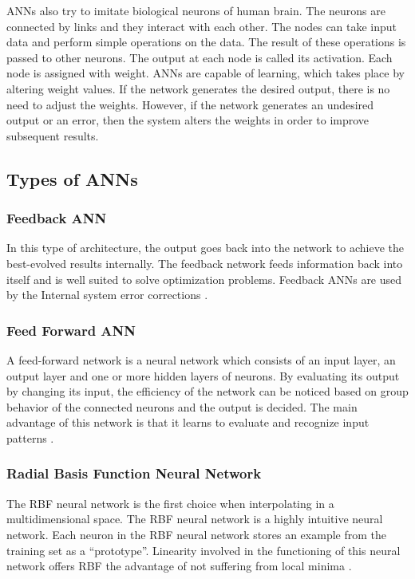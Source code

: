 ANNs also try to imitate biological neurons of human brain. The neurons are connected by links and they interact with each other. The nodes can take input data and perform simple operations on the data. The result of these operations is passed to other neurons. The output at each node is called its activation. Each node is assigned with weight. ANNs are capable of learning, which takes place by altering weight values. If the network generates the desired output, there is no need to adjust the weights. However, if the network generates an undesired output or an error, then the system alters the weights in order to improve subsequent results.

\subsection{Types of ANNs}

\subsubsection{Feedback ANN}

In this type of architecture, the output goes back into the network to achieve the best-evolved results internally. The feedback network feeds information back into itself and is well suited to solve optimization problems. Feedback ANNs are used by the Internal system error corrections \cite{Neuralnet}. 

\subsubsection{Feed Forward ANN}

A feed-forward network is a neural network which consists of an input layer, an output layer and one or more hidden layers of neurons. By evaluating its output by changing its input, the efficiency of the network can be noticed based on group behavior of the connected neurons and the output is decided. The main advantage of this network is that it learns to evaluate and recognize input patterns \cite{Neuralnet}.

\subsubsection{Radial Basis Function Neural Network}

The RBF neural network is the first choice when interpolating in a multidimensional space. The RBF neural network is a highly intuitive neural network. Each neuron in the RBF neural network stores an example from the training set as a ``prototype''. Linearity involved in the functioning of this neural network offers RBF the advantage of not suffering from local minima \cite{Neuralnet}.

